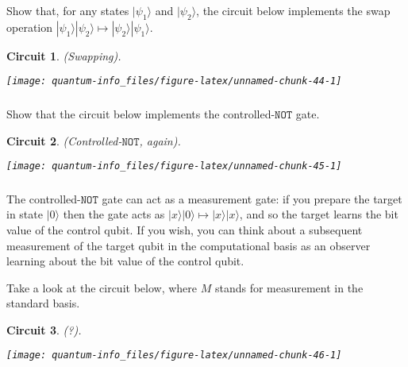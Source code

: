 \documentclass[fleqn]{article}
\newtheorem*{circuit}{Circuit}
\begin{document}
Show that, for any states \(|\psi_1\rangle\) and \(|\psi_2\rangle\), the circuit below implements the swap operation \(|\psi_1\rangle|\psi_2\rangle \mapsto |\psi_2\rangle|\psi_1\rangle\).

\begin{circuit}

(Swapping).

\begin{center}\texttt{[image: quantum-info\_files/figure-latex/unnamed-chunk-44-1]} \end{center}

\end{circuit}

\hypertarget{section-12}{%
\subsubsection{}\label{section-12}}

Show that the circuit below implements the controlled-\(\texttt{NOT}\) gate.

\begin{circuit}

(Controlled-\(\texttt{NOT}\), again).

\begin{center}\texttt{[image: quantum-info\_files/figure-latex/unnamed-chunk-45-1]} \end{center}

\end{circuit}

\hypertarget{section-13}{%
\subsubsection{}\label{section-13}}

The controlled-\(\texttt{NOT}\) gate can act as a measurement gate: if you prepare the target in state \(|0\rangle\) then the gate acts as \(|x\rangle|0\rangle\mapsto|x\rangle|x\rangle\), and so the target learns the bit value of the control qubit.
If you wish, you can think about a subsequent measurement of the target qubit in the computational basis as an observer learning about the bit value of the control qubit.

Take a look at the circuit below, where \(M\) stands for measurement in the standard basis.

\begin{circuit}

(?).

\begin{center}\texttt{[image: quantum-info\_files/figure-latex/unnamed-chunk-46-1]} \end{center}

\end{circuit}
\end{document}
